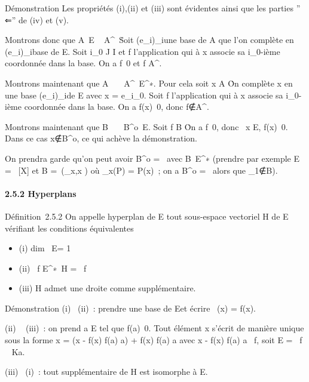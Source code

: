 \documentclass[]{article}
\begin{document}
Démonstration Les propriétés (i),(ii) et (iii) sont évidentes ainsi que
les parties '' ⇐'' de (iv) et (v).

Montrons donc que A\neq~E \rigtharrow~
A^\bot\neq~\0\.
Soit (e_i)_i\inI une base de A que l'on complète en
(e_i)_i\inJ base de E. Soit i_0 \in J \diagdown I et f
l'application qui à x associe sa i_0-ième coordonnée dans la
base. On a f\neq~0 et f \in A^\bot.

Montrons maintenant que
A\neq~\0\ \rigtharrow~
A^\bot\neq~E^∗. Pour cela soit
x \in A \diagdown\0\. On complète x en une base
(e_i)_i\inI de E avec x = e_i_0. Soit
f l'application qui à x associe sa i_0-ième coordonnée dans la
base. On a f(x)\neq~0, donc
f∉A^\bot.

Montrons maintenant que
B\neq~\0\ \rigtharrow~
B^o\neq~E. Soit f \in B
\diagdown\0\. On a
f\neq~0, donc \exists~x \in E,
f(x)\neq~0. Dans ce cas
x∉B^o, ce qui achève la
démonstration.

On prendra garde qu'on peut avoir B^o =
\0\ avec
B\neq~E^∗ (prendre par exemple E =
~[X] et B =\
\mathrmVect(\epsilon_x,x \in {}) où \epsilon_x(P)
= P(x)~; on a B^o = \0\
alors que \epsilon_1∉B).

\paragraph{2.5.2 Hyperplans}

Définition~2.5.2 On appelle hyperplan de E tout sous-espace vectoriel H
de E vérifiant les conditions équivalentes

\begin{itemize}
\itemsep1pt\parskip0pt
\item
  (i) dim~ E\diagupH = 1
\item
  (ii) \exists~f \in
  E^∗\diagdown\0\, H
  = \mathrmKer~f
\item
  (iii) H admet une droite comme supplémentaire.
\end{itemize}

Démonstration (i) \rigtharrow~(ii)~: prendre \overlinee une base
de E\diagupH et écrire \pi~(x) = f(x)\overlinee.

(ii) \rigtharrow~ (iii)~: on prend a \in E tel que f(a)\neq~0.
Tout élément x s'écrit de manière unique sous la forme x = (x - f(x)
\over f(a) a) + f(x) \over f(a) a
avec x - f(x) \over f(a) a
\in\mathrmKer~f, soit E
= \mathrmKer~f \oplus~ Ka.

(iii) \rigtharrow~(i)~: tout supplémentaire de H est isomorphe à E\diagupH.
\end{document}
